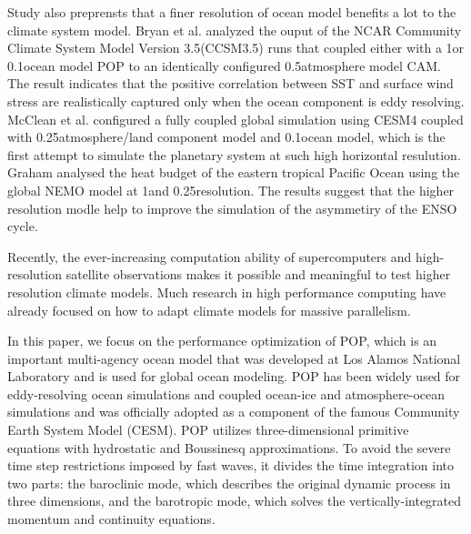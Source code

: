 \documentclass{sig-alternate}
\begin{document}
Study also preprensts that a finer resolution of ocean model benefits a lot to the climate system model.
Bryan et al. \cite{bryan2010frontal} analyzed the ouput of the NCAR Community Climate System Model Version 3.5(CCSM3.5) runs that coupled either with a 1\degree  or 0.1\degree ocean model POP to an identically configured 0.5\degree atmosphere model CAM. 
The result indicates that the positive correlation between SST and surface wind stress are realistically captured only when the ocean component is eddy resolving. 
McClean et al. \cite{mcclean2011prototype} configured a fully coupled global simulation using CESM4 coupled with 0.25\degree atmosphere/land component model and 0.1\degree ocean model, which is the first attempt to simulate the planetary system at such high horizontal resulution. 
Graham \cite{graham2014importance} analysed the heat budget of the eastern tropical Pacific Ocean using the global NEMO model at 1\degree and 0.25\degree resolution. The results suggest that the higher resolution modle help to improve the simulation of the asymmetiry of the ENSO cycle. 

Recently, the ever-increasing computation ability of supercomputers and high-resolution satellite observations makes it possible and meaningful to test higher resolution climate models. 
Much research in high performance computing have already focused on how to adapt climate models for massive parallelism.

In this paper, we focus on the performance optimization of POP, which is an important multi-agency ocean model that was developed at Los Alamos National Laboratory and is used for global ocean modeling. POP has been widely used for eddy-resolving ocean simulations\cite{mcclean2002eulerian} and coupled ocean-ice and atmosphere-ocean simulations\cite{May2002preliminary} and was officially adopted as a component of the famous Community Earth System Model (CESM). POP utilizes three-dimensional primitive equations with hydrostatic and Boussinesq approximations. To avoid the severe time step restrictions imposed by fast waves, it divides the time integration into two parts: the baroclinic mode, which describes the original dynamic process in three dimensions, and the barotropic mode, which solves the vertically-integrated momentum and continuity equations\cite{smith2010parallel}.
\end{document}
